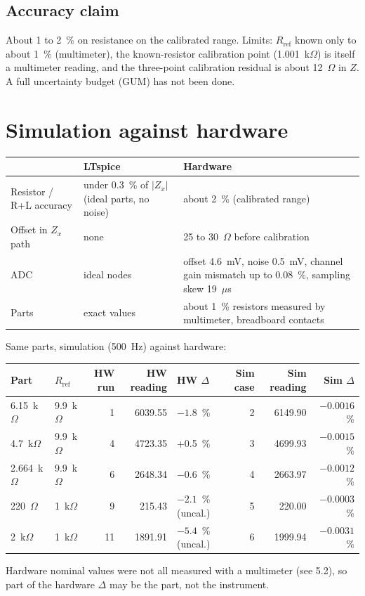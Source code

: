 \documentclass[11pt,a4paper]{article}
\newcommand{\Rref}{R_{\mathrm{ref}}}
\newcommand{\Zx}{Z_x}
\begin{document}
\subsection{Accuracy claim}
About 1 to 2~\% on resistance on the calibrated range. Limits: $\Rref$ known only to about 1~\% (multimeter), the known-resistor calibration point (1.001~k$\Omega$) is itself a multimeter reading, and the three-point calibration residual is about 12~$\Omega$ in $Z$. A full uncertainty budget (GUM) has not been done.

\section{Simulation against hardware}
\begin{center}
\small
\begin{tabular}{p{3.6cm}p{4.6cm}p{7cm}}
\toprule
 & LTspice & Hardware \\
\midrule
Resistor / R+L accuracy & under 0.3~\% of $|\Zx|$ (ideal parts, no noise) & about 2~\% (calibrated range) \\
Offset in $\Zx$ path & none & 25 to 30~$\Omega$ before calibration \\
ADC & ideal nodes & offset 4.6~mV, noise 0.5~mV, channel gain mismatch up to 0.08~\%, sampling skew 19~$\mu$s \\
Parts & exact values & about 1~\% resistors measured by multimeter, breadboard contacts \\
\bottomrule
\end{tabular}
\end{center}

Same parts, simulation (500~Hz) against hardware:
\begin{center}
\small
\begin{tabular}{llrrlrrr}
\toprule
Part & $\Rref$ & HW run & HW reading & HW $\Delta$ & Sim case & Sim reading & Sim $\Delta$ \\
\midrule
6.15~k$\Omega$ & 9.9~k$\Omega$ & 1 & 6039.55 & $-1.8$~\% & 2 & 6149.90 & $-0.0016$~\% \\
4.7~k$\Omega$ & 9.9~k$\Omega$ & 4 & 4723.35 & +0.5~\% & 3 & 4699.93 & $-0.0015$~\% \\
2.664~k$\Omega$ & 9.9~k$\Omega$ & 6 & 2648.34 & $-0.6$~\% & 4 & 2663.97 & $-0.0012$~\% \\
220~$\Omega$ & 1~k$\Omega$ & 9 & 215.43 & $-2.1$~\% (uncal.) & 5 & 220.00 & $-0.0003$~\% \\
2~k$\Omega$ & 1~k$\Omega$ & 11 & 1891.91 & $-5.4$~\% (uncal.) & 6 & 1999.94 & $-0.0031$~\% \\
\bottomrule
\end{tabular}
\end{center}
{\small Hardware nominal values were not all measured with a multimeter (see 5.2), so part of the hardware $\Delta$ may be the part, not the instrument.}
\end{document}
